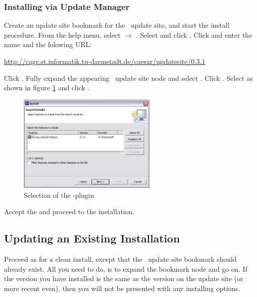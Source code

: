 \subsubsection{Installing via Update Manager} 
Create an update site bookmark for the \cjdt ~update site, and start the install procedure.
From the help menu, select  $\rightarrow$ . Select  and click .
Click  and enter the name  and the folowing URL:  
\begin{center}
\href{http://cage.st.informatik.tu-darmstadt.de/caesar/updatesite/0.3.1}{http://cage.st.informatik.tu-darmstadt.de/caesar/updatesite/0.3.1}
\end{center}
Click .
Fully expand the appearing \cjdt ~update site node and select \markedtext{\caesarj}. Click
. Select  as shown in figure \ref{fig:installpage30} and click .\\

\begin{figure}[htbp]
	\centering
		\includegraphics[width=0.60\textwidth]{./images/install_page_3_0.png}
	\caption{Selection of the \caesarj -plugin}
	\label{fig:installpage30}
\end{figure}

Accept the  and proceed to the installation.

\subsection{Updating an Existing Installation}
Proceed as for a clean install, except that the \cjdt ~update site bookmark should already
exist. All you need to do, is to expand the bookmark node and go on. If the version you have
installed is the same as the version on the update site (or more recent even),
then you will not be presented with any installing options.

